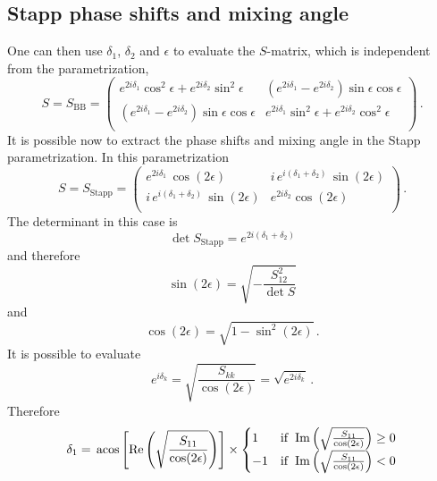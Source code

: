 \documentclass[10pt,a4paper]{article}
\newcommand{\mtm}[1]{\mathrm{#1}}
\begin{document}
	\subsection{Stapp phase shifts and mixing angle}
	One can then use $\delta_1$, $\delta_2$ and $\epsilon$ to evaluate  the $S$-matrix, which is independent from the parametrization,
	\begin{equation}
		S = S_\mtm{BB} = 
		\left(
		\begin{array}{cc}
			e^{2 i \delta _1} \cos ^2\epsilon + e^{2 i \delta _2} \sin ^2\epsilon & 
			\left(e^{2 i \delta _1} -e^{2 i \delta _2}\right) \sin \epsilon  \cos\epsilon \\
			\left(e^{2 i \delta _1} -e^{2 i \delta _2}\right) \sin \epsilon  \cos\epsilon &
			e^{2 i \delta _1} \sin ^2\epsilon+e^{2 i \delta _2} \cos
			^2\epsilon \\
		\end{array}
		\right)\,.
	\end{equation}
	It is possible now to extract the phase shifts and mixing angle in the Stapp parametrization.
	In this parametrization 
	\begin{equation}
		S = S_\mtm{Stapp} = 
		\left(
		\begin{array}{cc}
			e^{2 i \delta _1} \,\cos (2 \epsilon ) & i \,e^{i (\delta _1+\delta _2)}\, \sin (2 \epsilon ) \\
			i\, e^{i (\delta _1+\delta _2)}\, \sin (2 \epsilon ) & e^{2 i \delta _2} \cos (2 \epsilon ) \\
		\end{array}
		\right)\,.
	\end{equation}
	The determinant in this case is 
	\begin{equation}
		\det S_\mtm{Stapp} = e^{2 i \left(\delta _1+\delta _2\right)}
	\end{equation}
	and therefore
	\begin{equation}
		\sin(2\epsilon) = \sqrt{-\frac{S_{12}^2}{\det S}}
	\end{equation}
	and 
	\begin{equation}
		\cos(2\epsilon) = \sqrt{1-\sin^2(2\epsilon)}\,.
	\end{equation}
	It is possible to evaluate
	\begin{equation}
		e^{i\delta_k} = \sqrt{\frac{S_{kk}}{\cos(2\epsilon)}}
		=
		\sqrt{e^{2i\delta_k}}\,.
	\end{equation}
	Therefore
	\begin{equation}
		\delta_1 =
		\,\acos\left[\Re\left(\sqrt{\frac{S_{11}}{\cos(2\epsilon)}}\right)\right]
		\times
		\begin{cases}
			1 & \mathrm{if~}\Im\left(\sqrt{\frac{S_{11}}{\cos(2\epsilon)}}\right) \ge 0 \\
			-1 & \mathrm{if~}\Im\left(\sqrt{\frac{S_{11}}{\cos(2\epsilon)}}\right) < 0
		\end{cases}
	\end{equation}
\end{document}
